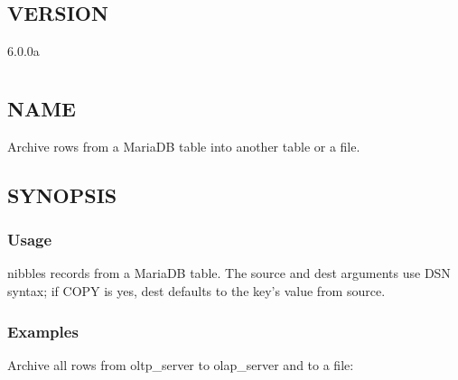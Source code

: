 \documentclass[letterpaper,10pt,english]{sphinxmanual}
\begin{document}
\section{VERSION}
\label{\detokenize{mariadb-align-output:version}}
 6.0.0a


\chapter{}
\label{\detokenize{mariadb-archiver:mariadb-archiver}}\label{\detokenize{mariadb-archiver::doc}}

\section{NAME}
\label{\detokenize{mariadb-archiver:name}}
 \sphinxhyphen{} Archive rows from a MariaDB table into another table or a file.


\section{SYNOPSIS}
\label{\detokenize{mariadb-archiver:synopsis}}

\subsection{Usage}
\label{\detokenize{mariadb-archiver:usage}}
\begin{sphinxVerbatim}[commandchars=\\\{\}]
 \PYG{p}{[}\PYG{p}{]}    
\end{sphinxVerbatim}

 nibbles records from a MariaDB table.  The \textendash{}source and \textendash{}dest
arguments use DSN syntax; if COPY is yes, \textendash{}dest defaults to the key’s value
from \textendash{}source.


\subsection{Examples}
\label{\detokenize{mariadb-archiver:examples}}
Archive all rows from oltp\_server to olap\_server and to a file:
\end{document}

